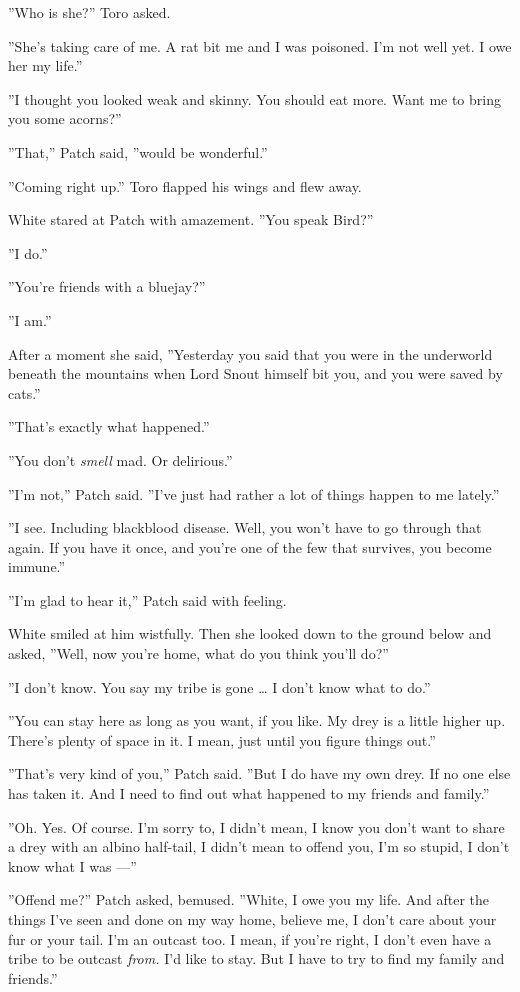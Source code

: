 \documentclass[12pt]{book}
\begin{document}
''Who is she?'' Toro asked.

''She's taking care of me. A rat bit me and I was poisoned. I'm not
well yet. I owe her my life.''

''I thought you looked weak and skinny. You should eat more. Want me
to bring you some acorns?''

''That,'' Patch said, ''would be wonderful.''

''Coming right up.'' Toro flapped his wings and flew away.

White stared at Patch with amazement. ''You speak Bird?''

''I do.''

''You're friends with a bluejay?''

''I am.''

After a moment she said, ''Yesterday you said that you were in the
underworld beneath the mountains when Lord Snout himself bit you, and
you were saved by cats.''

''That's exactly what happened.''

''You don't \textit{smell} mad. Or delirious.''

''I'm not,'' Patch said. ''I've just had rather a lot of things happen
to me lately.''

''I see. Including blackblood disease. Well, you won't have to go
through that again. If you have it once, and you're one of the few
that survives, you become immune.''

''I'm glad to hear it,'' Patch said with feeling.

White smiled at him wistfully. Then she looked down to the ground
below and asked, ''Well, now you're home, what do you think you'll
do?''

''I don't know. You say my tribe is gone \ldots{} I don't know what to
do.''

''You can stay here as long as you want, if you like. My drey is a
little higher up. There's plenty of space in it. I mean, just until
you figure things out.''

''That's very kind of you,'' Patch said. ''But I do have my own
drey. If no one else has taken it. And I need to find out what
happened to my friends and family.''

''Oh. Yes. Of course. I'm sorry to, I didn't mean, I know you don't
want to share a drey with an albino half-tail, I didn't mean to offend
you, I'm so stupid, I don't know what I was ---''

''Offend me?'' Patch asked, bemused. ''White, I owe you my life. And
after the things I've seen and done on my way home, believe me, I
don't care about your fur or your tail. I'm an outcast too. I mean, if
you're right, I don't even have a tribe to be outcast \textit{from.}
I'd like to stay. But I have to try to find my family and friends.''
\end{document}
